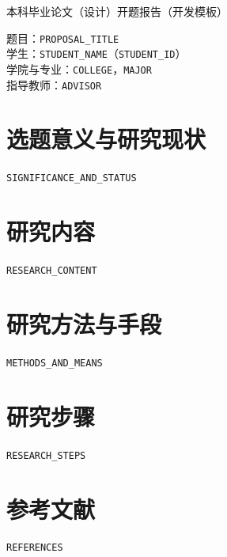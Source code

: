 \documentclass[UTF8,a4paper,12pt]{ctexart}
\begin{document}
\begin{center}
  {\Large 本科毕业论文（设计）开题报告（开发模板）}
\end{center}

题目：\texttt{PROPOSAL\_TITLE}\\
学生：\texttt{STUDENT\_NAME}（\texttt{STUDENT\_ID}）\\
学院与专业：\texttt{COLLEGE}，\texttt{MAJOR}\\
指导教师：\texttt{ADVISOR}

\section*{选题意义与研究现状}
\texttt{SIGNIFICANCE\_AND\_STATUS}
\section*{研究内容}
\texttt{RESEARCH\_CONTENT}
\section*{研究方法与手段}
\texttt{METHODS\_AND\_MEANS}
\section*{研究步骤}
\texttt{RESEARCH\_STEPS}
\section*{参考文献}
\texttt{REFERENCES}
\end{document}
